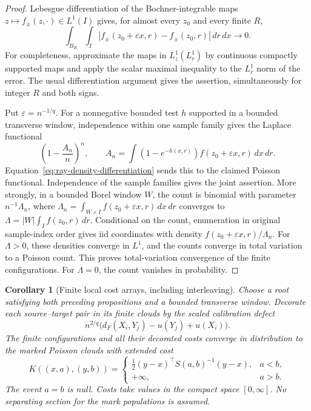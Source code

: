\documentclass[11pt,reqno]{amsart}
\newtheorem{corollary}[theorem]{Corollary}
\theoremstyle{definition}
\theoremstyle{remark}
\numberwithin{equation}{section}
\begin{document}
\begin{proof}
Lebesgue differentiation of the Bochner-integrable maps
\(z\mapsto f_\pm(z,\cdot)\in L^1(I)\) gives, for almost every
\(z_0\) and every finite \(R\),
\begin{equation}
\int_{B_R}\int_I
|f_\pm(z_0+\varepsilon x,r)-f_\pm(z_0,r)|\,dr\,dx\longrightarrow0.
\label{eq:ray-density-differentiation}
\end{equation}
For completeness, approximate the maps in \(L^1_z(L^1_r)\) by
continuous compactly supported maps and apply the scalar maximal
inequality to the \(L^1_r\) norm of the error. The usual
differentiation argument gives the assertion, simultaneously for
integer \(R\) and both signs.

Put \(\varepsilon=n^{-1/q}\). For a nonnegative bounded test \(h\)
supported in a bounded transverse window, independence within one
sample family gives the Laplace functional
\[
\left(1-\frac{A_n}{n}\right)^n,
\qquad A_n=\int(1-e^{-h(x,r)})f(z_0+\varepsilon x,r)\,dx\,dr.
\]
Equation~\eqref{eq:ray-density-differentiation} sends this to the
claimed Poisson functional. Independence of the sample families
gives the joint assertion. More strongly, in a bounded Borel window
\(W\), the count is binomial with parameter
\(n^{-1}\Lambda_n\), where
\(\Lambda_n=\int_{W\times I}f(z_0+\varepsilon x,r)\,dx\,dr\)
converges to \(\Lambda=|W|\int_I f(z_0,r)\,dr\).
Conditional on the count, enumeration in original sample-index
order gives iid coordinates with density
\(f(z_0+\varepsilon x,r)/\Lambda_n\).
For \(\Lambda>0\), these densities converge in \(L^1\), and the
counts converge in total variation to a Poisson count. This proves
total-variation convergence of the finite configurations.
For \(\Lambda=0\), the count vanishes in probability.
\end{proof}

\begin{corollary}[Finite local cost arrays, including interleaving]
\label{cor:rough-ray-cost-array}
Choose a root satisfying both preceding propositions and a bounded
transverse window. Decorate each source--target pair in its finite
clouds by the scaled calibration defect
\[
n^{2/q}\bigl(d_F(X_i,Y_j)-u(Y_j)+u(X_i)\bigr).
\]
The finite configurations and all their decorated costs converge
in distribution to the marked Poisson clouds with extended cost
\begin{equation}
K((x,a),(y,b))=
\begin{cases}
\frac12(y-x)^\top S(a,b)^{-1}(y-x),&a<b,\\
+\infty,&a>b.
\end{cases}
\label{eq:rough-ray-extended-cost}
\end{equation}
The event \(a=b\) is null. Costs take values in the compact space
\([0,\infty]\). No separating section for the mark populations
is assumed.
\end{corollary}
\end{document}
